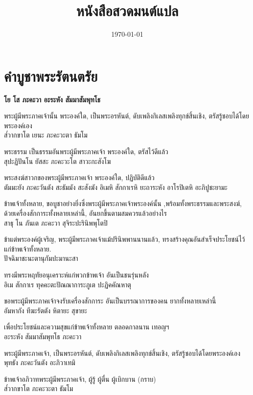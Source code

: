\documentclass{article}
\title{หนังสือสวดมนต์แปล}
\date{\today}
\begin{document}
\pagecolor{lightyellow}
\maketitle
\newpage
\tableofcontents

\pagebreak
\section{คำบูชาพระรัตนตรัย}
\bf โย โส ภะคะวา อะระหัง สัมมาสัมพุทโธ

พระผู้มีพระภาคเจ้านั้น พระองค์ใด, เป็นพระอรหันต์, 
ดับเพลิงกิเลสเพลิงทุกข์สิ้นเชิง, ตรัสรู้ชอบได้โดยพระองค์เอง\\
ส๎วากขาโต เยนะ ภะคะวะตา ธัมโม 

พระธรรม เป็นธรรมอันพระผู้มีพระภาคเจ้า พระองค์ใด, ตรัสไว้ดีแล้ว\\
สุปะฏิปันโน ยัสสะ ภะคะวะโต สาวะกะสังโฆ

พระสงฆ์สาวกของพระผู้มีพระภาคเจ้า พระองค์ใด, ปฏิบัติดีแล้ว\\
ตัมมะยัง ภะคะวันตัง สะธัมมัง สะสังฆัง
อิเมหิ สักกาเรหิ ยะถาระหัง อาโรปิเตหิ อะภิปูชะยามะ

ข้าพเจ้าทั้งหลาย, ขอบูชาอย่างยิ่งซึ่งพระผู้มีพระภาคเจ้าพระองค์นั้น
,พร้อมทั้งพระธรรมและพระสงฆ์,
ด้วยเครื่องสักการะทั้งหลายเหล่านี้, อันยกขึ้นตามสมควรแล้วอย่างไร\\
สาธุ โน ภันเต ภะคะวา สุจิระปะรินิพพุโตปิ

ข้าแต่พระองค์ผู้เจริญ, พระผู้มีพระภาคเจ้าแม้ปรินิพพานนานแล้ว,
ทรงสร้างคุณอันสำเร็จประโยชน์ไว้แก่ข้าพเจ้าทั้งหลาย.\\
ปัจฉิมาชะนะตานุกัมปะมานะสา

ทรงมีพระหฤทัยอนุเคราะห์แก่พวกข้าพเจ้า อันเป็นชนรุ่นหลัง\\
อิเม สักกาเร ทุคคะตะปัณณาการะภูเต ปะฏิคคัณหาตุ

ขอพระผู้มีพระภาคเจ้าจงรับเครื่องสักการะ อันเป็นบรรณาการของคน
ยากทั้งหลายเหล่านี้\\
อัมหากัง ทีฆะรัตตัง หิตายะ สุขายะ

เพื่อประโยชน์และความสุขแก่ข้าพเจ้าทั้งหลาย ตลอดกาลนาน เทอญฯ\\
อะระหัง สัมมาสัมพุทโธ ภะคะวา

พระผู้มีพระภาคเจ้า, เป็นพระอรหันต์, ดับเพลิงกิเลสเพลิงทุกข์สิ้นเชิง,
ตรัสรู้ชอบได้โดยพระองค์เอง\\
พุทธัง ภะคะวันตัง อะภิวาเทมิ

ข้าพเจ้าอภิวาทพระผู้มีพระภาคเจ้า, ผู้รู้ ผู้ตื่น ผู้เบิกบาน (กราบ)\\
ส๎วากขาโต ภะคะวะตา ธัมโม 
\end{document}
